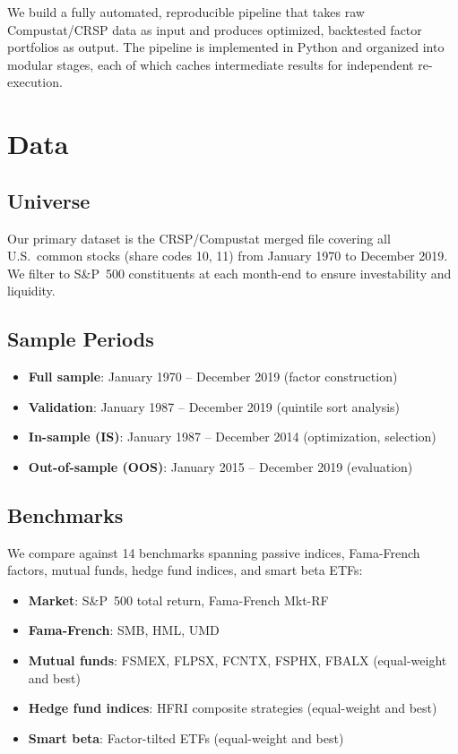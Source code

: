 \documentclass[12pt,a4paper]{article}
\begin{document}
We build a fully automated, reproducible pipeline that takes raw Compustat/CRSP data as input and produces optimized, backtested factor portfolios as output. The pipeline is implemented in Python and organized into modular stages, each of which caches intermediate results for independent re-execution.

\section{Data}

\subsection{Universe}

Our primary dataset is the CRSP/Compustat merged file covering all U.S.\ common stocks (share codes 10, 11) from January 1970 to December 2019. We filter to S\&P~500 constituents at each month-end to ensure investability and liquidity.

\subsection{Sample Periods}

\begin{itemize}[noitemsep]
    \item \textbf{Full sample}: January 1970 -- December 2019 (factor construction)
    \item \textbf{Validation}: January 1987 -- December 2019 (quintile sort analysis)
    \item \textbf{In-sample (IS)}: January 1987 -- December 2014 (optimization, selection)
    \item \textbf{Out-of-sample (OOS)}: January 2015 -- December 2019 (evaluation)
\end{itemize}

\subsection{Benchmarks}

We compare against 14 benchmarks spanning passive indices, Fama-French factors, mutual funds, hedge fund indices, and smart beta ETFs:

\begin{itemize}[noitemsep]
    \item \textbf{Market}: S\&P~500 total return, Fama-French Mkt-RF
    \item \textbf{Fama-French}: SMB, HML, UMD
    \item \textbf{Mutual funds}: FSMEX, FLPSX, FCNTX, FSPHX, FBALX (equal-weight and best)
    \item \textbf{Hedge fund indices}: HFRI composite strategies (equal-weight and best)
    \item \textbf{Smart beta}: Factor-tilted ETFs (equal-weight and best)
\end{itemize}
\end{document}
